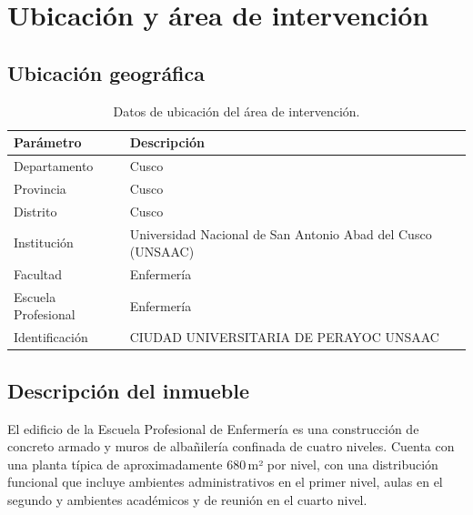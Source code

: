 \section{Ubicación y área de intervención}
\label{sec:ubicacion}

\subsection{Ubicación geográfica}

\begin{table}[H]
    \centering
    \caption{Datos de ubicación del área de intervención.}
    \label{tab:ubicacion}
    \begin{tabular}{|p{4.5cm}|p{9cm}|}
        \hline
        \textbf{Parámetro} & \textbf{Descripción} \\
        \hline
        Departamento       & Cusco \\
        \hline
        Provincia          & Cusco \\
        \hline
        Distrito           & Cusco \\
        \hline
        Institución        & Universidad Nacional de San Antonio Abad del Cusco
                             (UNSAAC) \\
        \hline
        Facultad           & Enfermería \\
        \hline
        Escuela Profesional & Enfermería \\
        \hline
        Identificación     & CIUDAD UNIVERSITARIA DE PERAYOC UNSAAC \\
        \hline
    \end{tabular}
\end{table}%
\nobreak\vspace{-0.3cm}
\subsection{Descripción del inmueble}

El edificio de la Escuela Profesional de Enfermería es una construcción de
concreto armado y muros de albañilería confinada de cuatro niveles. Cuenta con
una planta típica de aproximadamente 680\,m² por nivel, con una distribución
funcional que incluye ambientes administrativos en el primer nivel, aulas en el
segundo y ambientes académicos y de reunión en el cuarto nivel.

